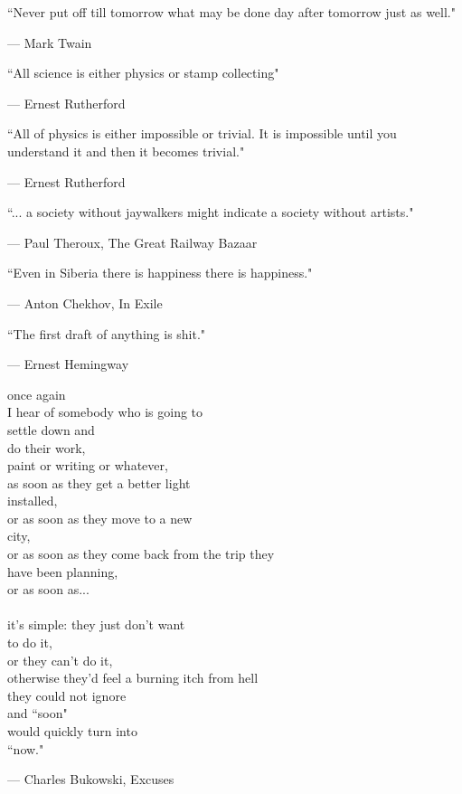 \documentclass{report}
\begin{document}
\epigraph{``Never put off till tomorrow what may be done day after tomorrow just as well."}{--- \textup{Mark Twain}}

\epigraph{``All science is either physics or stamp collecting"}{--- \textup{Ernest Rutherford}}

\epigraph{``All of physics is either impossible or trivial. It is impossible until you understand it and then it becomes trivial."}{--- \textup{Ernest Rutherford}}

\epigraph{``... a society without jaywalkers might indicate a society without artists."}{--- \textup{Paul Theroux}, The Great Railway Bazaar}

\epigraph{``Even in Siberia there is happiness there is happiness."}{--- \textup{Anton Chekhov}, In Exile}

\epigraph{``The first draft of anything is shit."}{--- \textup{Ernest Hemingway}}

\epigraph{once again\\
I hear of somebody who is going to\\
settle down and \\
do their work,\\
paint or writing or whatever,\\
as soon as they get a better light\\
installed,\\
or as soon as they move to a new\\
city,\\
or as soon as they come back from the trip they\\
have been planning,\\
or as soon as...\\ \\
it's simple: they just don't want\\
to do it,\\
or they can't do it,\\
otherwise they'd feel a burning itch from hell\\
they could not ignore\\
and ``soon"\\
would quickly turn into\\
``now."}{--- \textup{Charles Bukowski}, Excuses}
\end{document}
